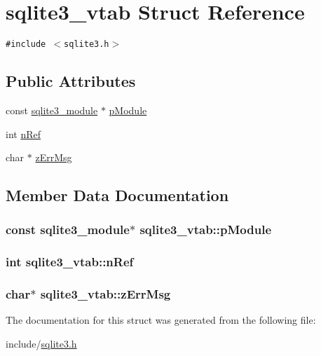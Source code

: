 \hypertarget{structsqlite3__vtab}{
\section{sqlite3\_\-vtab Struct Reference}
\label{structsqlite3__vtab}
}
{\tt \#include $<$sqlite3.h$>$}

\subsection*{Public Attributes}
\begin{CompactItemize}
\item 
const \hyperlink{structsqlite3__module}{sqlite3\_\-module} $\ast$ \hyperlink{structsqlite3__vtab_4ef8198ca611b73a9b23054dd1e91e2b}{pModule}
\item 
int \hyperlink{structsqlite3__vtab_b3c80d385849bdd82363a0df7d6fcba8}{nRef}
\item 
char $\ast$ \hyperlink{structsqlite3__vtab_fc50eadfdd7cef876633d460deba48d6}{zErrMsg}
\end{CompactItemize}


\subsection{Member Data Documentation}
\hypertarget{structsqlite3__vtab_4ef8198ca611b73a9b23054dd1e91e2b}{
\subsubsection[pModule]{\setlength{\rightskip}{0pt plus 5cm}const {\bf sqlite3\_\-module}$\ast$ {\bf sqlite3\_\-vtab::pModule}}}
\label{structsqlite3__vtab_4ef8198ca611b73a9b23054dd1e91e2b}


\hypertarget{structsqlite3__vtab_b3c80d385849bdd82363a0df7d6fcba8}{
\subsubsection[nRef]{\setlength{\rightskip}{0pt plus 5cm}int {\bf sqlite3\_\-vtab::nRef}}}
\label{structsqlite3__vtab_b3c80d385849bdd82363a0df7d6fcba8}


\hypertarget{structsqlite3__vtab_fc50eadfdd7cef876633d460deba48d6}{
\subsubsection[zErrMsg]{\setlength{\rightskip}{0pt plus 5cm}char$\ast$ {\bf sqlite3\_\-vtab::zErrMsg}}}
\label{structsqlite3__vtab_fc50eadfdd7cef876633d460deba48d6}




The documentation for this struct was generated from the following file:\begin{CompactItemize}
\item 
include/\hyperlink{sqlite3_8h}{sqlite3.h}\end{CompactItemize}
